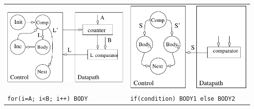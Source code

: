 
\begin{tabular}{|l|l|} \hline
\includegraphics{./Fig8/For}    & \includegraphics{./Fig8/IfThen}      \\ 
\verb-for(i=A; i<B; i++) BODY-  & \verb+if(condition) BODY1 else BODY2+\\ \hline


\end{tabular}
